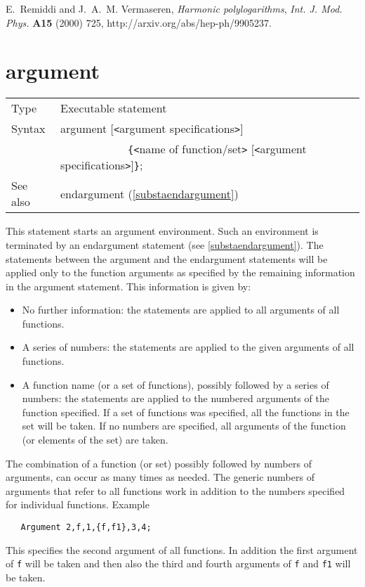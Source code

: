 E.~Remiddi and J.~A.~M. Vermaseren, {\it Harmonic polylogarithms},  {\em 
Int. J. Mod. Phys.} {\bf A15} (2000) 725,
  http://arxiv.org/abs/hep-ph/9905237.
\vspace{10mm}


\section{argument}
\label{substaargument}

\noindent \begin{tabular}{ll}
Type & Executable statement\\
Syntax & argument [{\tt<}argument specifications{\tt>}] \\ &
    \ \ \ \ \ \ \ \ \ \ \ \
 \verb:{:{\tt<}name of function/set{\tt>}
[{\tt<}argument specifications{\tt>}]\verb:}:; \\
See also & endargument (\ref{substaendargument})
\end{tabular} \vspace{4mm}

\noindent This statement starts an argument 
environment. Such an environment is terminated 
by an endargument statement (see \ref{substaendargument}). The statements 
between the argument and the endargument\index{endargument} statements will 
be applied only to the function arguments as specified by the remaining 
information in the argument statement. This information is given by:
\begin{itemize}
\item   No further information: the statements are applied to all arguments 
of all functions.
\item   A series of numbers: the statements are applied to the given 
arguments of all functions.
\item   A function name (or a set of functions), possibly followed by a 
series of numbers: the statements are applied to the numbered arguments of 
the function specified. If a set of functions was specified, all the 
functions in the set will be taken. If no numbers are specified, all 
arguments of the function (or elements of the set) are taken.
\end{itemize}
The combination of a function (or set) possibly followed by numbers of 
arguments, can occur as many times as needed. The generic numbers of 
arguments that refer to all functions work in addition to the numbers 
specified for individual functions. Example\vspace{1mm}
\begin{verbatim}
   Argument 2,f,1,{f,f1},3,4;
\end{verbatim}
This specifies the second argument of all functions. In addition the first 
argument of \verb:f: will be taken and then also the third and fourth 
arguments of \verb:f: and \verb:f1: will be taken. \vspace{4mm}

